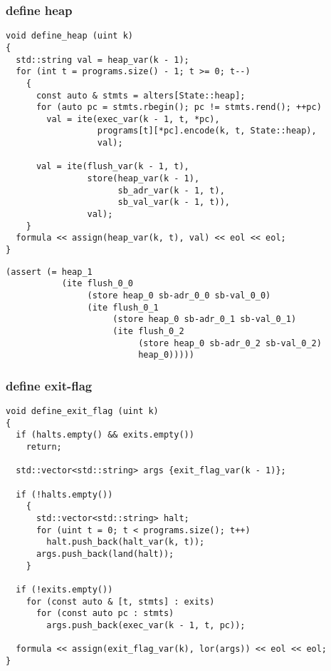 \subsubsection{define heap}

\begin{lstlisting}[style=c++]
void define_heap (uint k)
{
  std::string val = heap_var(k - 1);
  for (int t = programs.size() - 1; t >= 0; t--)
    {
      const auto & stmts = alters[State::heap];
      for (auto pc = stmts.rbegin(); pc != stmts.rend(); ++pc)
        val = ite(exec_var(k - 1, t, *pc),
                  programs[t][*pc].encode(k, t, State::heap),
                  val);

      val = ite(flush_var(k - 1, t),
                store(heap_var(k - 1),
                      sb_adr_var(k - 1, t),
                      sb_val_var(k - 1, t)),
                val);
    }
  formula << assign(heap_var(k, t), val) << eol << eol;
}
\end{lstlisting}

\begin{lstlisting}[language=SMTLib]
(assert (= heap_1
           (ite flush_0_0
                (store heap_0 sb-adr_0_0 sb-val_0_0)
                (ite flush_0_1
                     (store heap_0 sb-adr_0_1 sb-val_0_1)
                     (ite flush_0_2
                          (store heap_0 sb-adr_0_2 sb-val_0_2)
                          heap_0)))))
\end{lstlisting}

\subsubsection{define exit-flag}

\begin{lstlisting}[style=c++]
void define_exit_flag (uint k)
{
  if (halts.empty() && exits.empty())
    return;

  std::vector<std::string> args {exit_flag_var(k - 1)};

  if (!halts.empty())
    {
      std::vector<std::string> halt;
      for (uint t = 0; t < programs.size(); t++)
        halt.push_back(halt_var(k, t));
      args.push_back(land(halt));
    }

  if (!exits.empty())
    for (const auto & [t, stmts] : exits)
      for (const auto pc : stmts)
        args.push_back(exec_var(k - 1, t, pc));

  formula << assign(exit_flag_var(k), lor(args)) << eol << eol;
}
\end{lstlisting}

